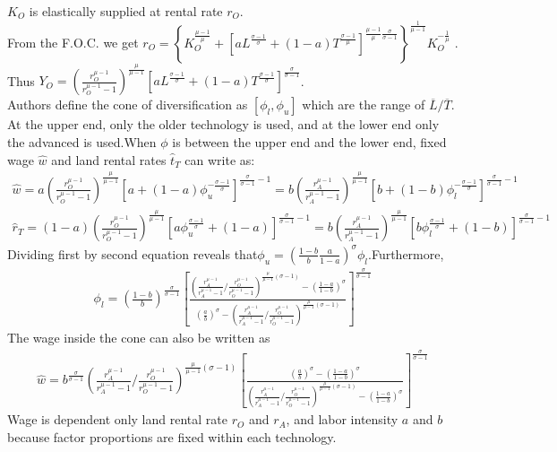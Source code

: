 \documentclass[../root]{subfiles}
\begin{document}
    $K_O$ is elastically supplied at rental rate $r_O$. \\
    From the F.O.C. we get $r_O= \left\{K_O^{\frac{\mu -1}{\mu}}+\left[a L^{\frac{\sigma -1}{\sigma}}+(1-a)T^{\frac{\sigma -1}{\mu}}\right]^{\frac{\mu-1}{\mu}\frac{\sigma}{\sigma-1}} \right\}^{\frac{1}{\mu-1}}K_O^{-\frac{1}{\mu}}$ . \\
    Thus $Y_O=\left(\frac{r_O^{\mu-1}}{r_O^{\mu-1}-1}\right)^{\frac{\mu}{\mu-1}} \left[a L^{\frac{\sigma -1}{\sigma}}+(1-a)T^{\frac{\sigma -1}{\sigma}}\right]^{\frac{\sigma}{\sigma-1}} $. \\
    Authors define the cone of diversification as $[\phi_l, \phi_u]$ which are the range of $\overline{L}/\overline{T}$.  \\
    At the upper end, only the older technology is used, and at the lower end only the advanced is used.When $\phi$ is between the upper end and the lower end, fixed wage $\hat{w}$ and land rental rates $\hat{t}_T$ can write as:
    \begin{align}
        \hat{w} =a\left(\frac{r_O^{\mu-1}}{r_O^{\mu-1}-1}\right)^{\frac{\mu}{\mu-1}} \left[a +(1-a)\phi_u^{-\frac{\sigma -1}{\sigma}}\right]^{\frac{\sigma}{\sigma-1}-1} 
        =b\left(\frac{r_A^{\mu-1}}{r_A^{\mu-1}-1}\right)^{\frac{\mu}{\mu-1}} \left[b +(1-b)\phi_l^{-\frac{\sigma -1}{\sigma}}\right]^{\frac{\sigma}{\sigma-1}-1} 
        \tag{A.2} \\
        \hat{r}_T=(1-a)\left(\frac{r_O^{\mu-1}}{r_O^{\mu-1}-1}\right)^{\frac{\mu}{\mu-1}} \left[a\phi_u^{\frac{\sigma -1}{\sigma}} +(1-a)\right]^{\frac{\sigma}{\sigma-1}-1} 
        =b\left(\frac{r_A^{\mu-1}}{r_A^{\mu-1}-1}\right)^{\frac{\mu}{\mu-1}} \left[b\phi_l^{\frac{\sigma -1}{\sigma}} +(1-b)\right]^{\frac{\sigma}{\sigma-1}-1}  \nonumber
    \end{align}
   Dividing first by second equation reveals that$\phi_u = (\frac{1-b}{b}\frac{a}{1-a})^{\sigma}\phi_l$.Furthermore, 
   \begin{align}
       \phi_l = (\frac{1-b}{b})^{\frac{\sigma}{\sigma-1}} \left[\frac{\left(\frac{r_A^{\mu-1}}{r_A^{\mu-1}-1}/\frac{r_O^{\mu-1}}{r_O^{\mu-1}-1} \right)^{\frac{\mu}{\mu-1}(\sigma-1)}- (\frac{1-a}{1-b})^{\sigma}}{(\frac{a}{b})^{\sigma} -\left(\frac{r_A^{\mu-1}}{r_A^{\mu-1}-1}/\frac{r_O^{\mu-1}}{r_O^{\mu-1}-1} \right)^{\frac{\mu}{\mu-1}(\sigma-1)}} \right]^{\frac{\sigma}{\sigma-1}} \tag{A.3}
   \end{align}
   The wage inside the cone can also be written as
   \begin{align}
       \hat{w} = b^{\frac{\sigma}{\sigma-1}}\left(\frac{r_A^{\mu-1}}{r_A^{\mu-1}-1}/\frac{r_O^{\mu-1}}{r_O^{\mu-1}-1} \right)^{\frac{\mu}{\mu-1}(\sigma-1)} \left[\frac{(\frac{a}{b})^{\sigma} - (\frac{1-a}{1-b})^{\sigma}}{\left(\frac{r_A^{\mu-1}}{r_A^{\mu-1}-1}/\frac{r_O^{\mu-1}}{r_O^{\mu-1}-1} \right)^{\frac{\mu}{\mu-1}(\sigma-1)}- (\frac{1-a}{1-b})^{\sigma}} \right]^{\frac{\sigma}{\sigma-1}}
   \end{align}
    Wage is dependent only land rental rate $r_O$ and $r_A$, and labor intensity $a$ and $b$ because factor proportions are fixed within each technology.  \\
    
\end{document}
